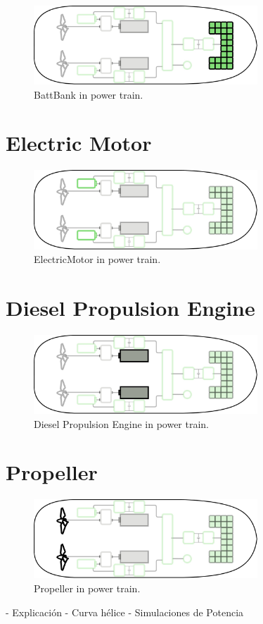\begin{figure}[h]
    \centering
    \includegraphics[width=0.75\textwidth]{images/chapter05/BattBank_scheme.jpg}
    \caption{BattBank in power train.}
    \label{BattBank}
\end{figure}

\section{Electric Motor}

\begin{figure}[h]
    \centering
    \includegraphics[width=0.75\textwidth]{images/chapter05/ElectricMotor_scheme.jpg}
    \caption{ElectricMotor in power train.}
    \label{ElectricMotor}
\end{figure}

\newpage

\section{Diesel Propulsion Engine}

\begin{figure}[!ht]
    \centering
    \includegraphics[width=0.75\textwidth]{images/chapter05/DieselEngine_scheme.jpg}
    \caption{Diesel Propulsion Engine in power train.}
    \label{Diesel Engine}
\end{figure}

\section{Propeller}

\begin{figure}[!ht]
    \centering
    \includegraphics[width=0.75\textwidth]{images/chapter05/Propeller_scheme.jpg}
    \caption{Propeller in power train.}
    \label{Propeller}
\end{figure}

- Explicación
- Curva hélice
- Simulaciones de Potencia